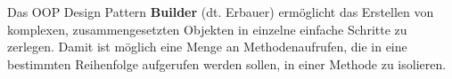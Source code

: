 Das OOP Design Pattern \textbf{Builder} (dt. Erbauer) ermöglicht das Erstellen von komplexen, zusammengesetzten Objekten in einzelne einfache Schritte zu zerlegen.
Damit ist möglich eine Menge an Methodenaufrufen, die 
in eine bestimmten Reihenfolge aufgerufen werden sollen, 
in einer Methode zu isolieren. 